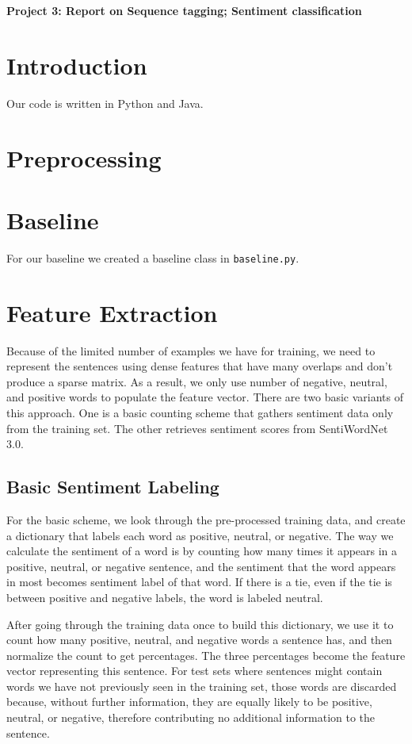 \documentclass{article}
\begin{document}
\begin{center}\textbf{Project 3: Report on Sequence tagging; Sentiment classification}\end{center}

\section{Introduction}

Our code is written in Python and Java.

\section{Preprocessing}

\section{Baseline}

For our baseline we created a baseline class in \texttt{baseline.py}.

\section{Feature Extraction}

Because of the limited number of examples we have for training, we need to represent the sentences using dense features that have many overlaps and don't produce a sparse matrix. As a result, we only use number of negative, neutral, and positive words to populate the feature vector. There are two basic variants of this approach. One is a basic counting scheme that gathers sentiment data only from the training set. The other retrieves sentiment scores from SentiWordNet 3.0.

\subsection{Basic Sentiment Labeling}

For the basic scheme, we look through the pre-processed training data, and create a dictionary that labels each word as positive, neutral, or negative. The way we calculate the sentiment of a word is by counting how many times it appears in a positive, neutral, or negative sentence, and the sentiment that the word appears in most becomes sentiment label of that word. If there is a tie, even if the tie is between positive and negative labels, the word is labeled neutral.

After going through the training data once to build this dictionary, we use it to count how many positive, neutral, and negative words a sentence has, and then normalize the count to get percentages. The three percentages become the feature vector representing this sentence. For test sets where sentences might contain words we have not previously seen in the training set, those words are discarded because, without further information, they are equally likely to be positive, neutral, or negative, therefore contributing no additional information to the sentence.
\end{document}
